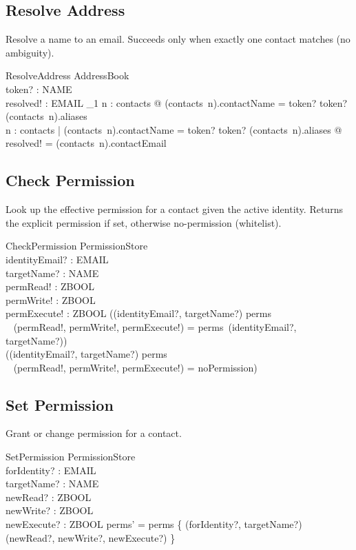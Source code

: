\documentclass[a4paper,10pt,fleqn]{article}
\begin{document}
\subsection{Resolve Address}

Resolve a name to an email. Succeeds only when exactly one contact
matches (no ambiguity).

\begin{schema}{ResolveAddress}
\Xi AddressBook \\
token? : NAME \\
resolved! : EMAIL
\where
\exists_1 n : \dom contacts @
  (contacts~n).contactName = token? \lor
  token? \in (contacts~n).aliases \\
\forall n : \dom contacts |
  (contacts~n).contactName = token? \lor
  token? \in (contacts~n).aliases @
  resolved! = (contacts~n).contactEmail
\end{schema}

\subsection{Check Permission}

Look up the effective permission for a contact given the active identity.
Returns the explicit permission if set, otherwise no-permission (whitelist).

\begin{schema}{CheckPermission}
\Xi PermissionStore \\
identityEmail? : EMAIL \\
targetName? : NAME \\
permRead! : ZBOOL \\
permWrite! : ZBOOL \\
permExecute! : ZBOOL
\where
((identityEmail?, targetName?) \in \dom perms \implies \\
\quad~ (permRead!, permWrite!, permExecute!) =
  perms~(identityEmail?, targetName?)) \\
((identityEmail?, targetName?) \notin \dom perms \implies \\
\quad~ (permRead!, permWrite!, permExecute!) = noPermission)
\end{schema}

\subsection{Set Permission}

Grant or change permission for a contact.

\begin{schema}{SetPermission}
\Delta PermissionStore \\
forIdentity? : EMAIL \\
targetName? : NAME \\
newRead? : ZBOOL \\
newWrite? : ZBOOL \\
newExecute? : ZBOOL
\where
perms' = perms \oplus
  \{ (forIdentity?, targetName?) \mapsto
    (newRead?, newWrite?, newExecute?) \}
\end{schema}
\end{document}
